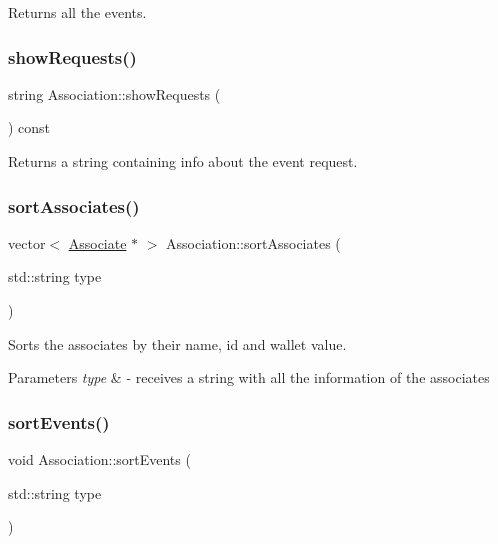 Returns all the events. 

\mbox{\label{classAssociation_a7d743e480f5dbba9189a40d17b931121}} 
\subsubsection{\texorpdfstring{show\+Requests()}{showRequests()}}
{\footnotesize\ttfamily string Association\+::show\+Requests (\begin{DoxyParamCaption}{ }\end{DoxyParamCaption}) const}



Returns a string containing info about the event request. 

\mbox{\label{classAssociation_a89d561169e68f61edd79cbef11bae683}} 
\subsubsection{\texorpdfstring{sort\+Associates()}{sortAssociates()}}
{\footnotesize\ttfamily vector$<$ \mbox{\hyperlink{classAssociate}{Associate}} $\ast$ $>$ Association\+::sort\+Associates (\begin{DoxyParamCaption}\item[{std\+::string}]{type }\end{DoxyParamCaption})}



Sorts the associates by their name, id and wallet value. 


\begin{DoxyParams}{Parameters}
{\em type} & -\/ receives a string with all the information of the associates \\
\hline
\end{DoxyParams}
\mbox{\label{classAssociation_a1f50c2dd311479652c3c5bb17d3770dc}} 
\subsubsection{\texorpdfstring{sort\+Events()}{sortEvents()}}
{\footnotesize\ttfamily void Association\+::sort\+Events (\begin{DoxyParamCaption}\item[{std\+::string}]{type }\end{DoxyParamCaption})}



